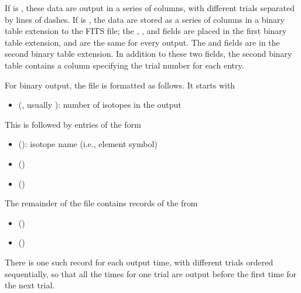 \documentclass[letterpaper,10pt,english]{sphinxmanual}
\begin{document}
If  is , these data are output in a series of
columns, with different trials separated by lines of dashes. If
 is , the data are stored as a series of
columns in a binary table extension to the FITS file; the ,
, and  fields are placed in the first binary table
extension, and are the same for every output. The  and
 fields are in the second binary table extension. In
addition to these two fields, the second binary table contains a
column specifying the trial number for each entry.

For binary output, the file is formatted as follows. It starts with
\begin{itemize}
\item {} 
 (, usually ): number of isotopes in the output

\end{itemize}

This is followed by  entries of the form
\begin{itemize}
\item {} 
 (): isotope name (i.e., element symbol)

\item {} 
 ()

\item {} 
 ()

\end{itemize}

The remainder of the file contains records of the from
\begin{itemize}
\item {} 
 ()

\item {} 
 ()

\end{itemize}

There is one such record for each output time, with different trials
ordered sequentially, so that all the times for one trial are output
before the first time for the next trial.
\end{document}
